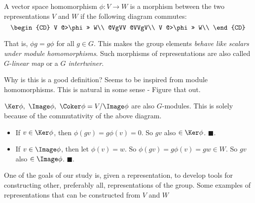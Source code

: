 A vector space homomorphism $\phi: V\to W$ is a morphism between the two representations $V$ and $W$ if the following diagram commutes:
\begin{equation} \begin{CD}
  V @>\phi>> W\\
  @VgVV @VVgV\\
  V @>\phi>> W\\
\end{CD} \end{equation}

That is, $\phi g=g\phi$ for all $g\in G$. This makes the group elements \emph{behave like scalars under module homomorphisms}. Such morphisms of representations are also called $G$-\emph{linear map} or a \emph{$G$ intertwiner}.

\begin{insight}
   Why is this is a good definition? Seems to be inspired from module homomorphisms. This is natural in some sense - Figure that out.
\end{insight}

$\Ker \phi,\ \Image \phi,\ \Coker \phi = V/\Image\phi$ are also $G$-modules. This is solely because of the commutativity of the above diagram.
\begin{itemize}
    \item If $v\in \Ker \phi$, then $\phi(gv) = g\phi(v) = 0$. So $gv$ also $\in \Ker \phi$. $\blacksquare$.
    \item If $v\in \Image \phi$, then let $\phi(v) = w$. So $\phi(gv)=g\phi(v)=gw \in W$. So $gv$ also $\in \Image \phi$. $\blacksquare$.
\end{itemize}

One of the goals of our study is, given a representation, to develop tools for constructing other, preferably all, representations of the group. 
Some examples of representations that can be constructed from $V$ and $W$


